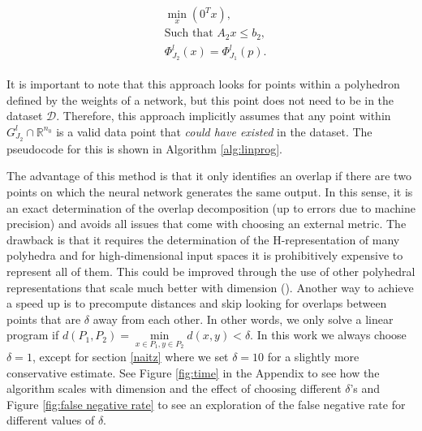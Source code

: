 \documentclass[10pt]{article} %
\theoremstyle{plain}
\theoremstyle{definition}
\theoremstyle{remark}
\begin{document}
\begin{align}
\begin{split}
    & \min\limits_{x}(0^Tx),\\
    & \text{Such that } A_2x \leq b_2, \\
    & \Phi^l_{J_2}(x) = \Phi^l_{J_1}(p).    
\end{split}
\end{align}

It is important to note that this approach looks for points within a polyhedron defined by the weights of a network, but this point does not need to be in the dataset $\mathcal{D}$. Therefore, this approach implicitly assumes that any point within $G^l_{J_2} \cap \mathbb{R}^{n_0}$ is a valid data point that \textit{could have existed} in the dataset. The pseudocode for this is shown in Algorithm \ref{alg:linprog}.


The advantage of this method is that it only identifies an overlap if there are two points on which the neural network generates the same output. In this sense, it is an exact determination of the overlap decomposition (up to errors due to machine precision) and avoids all issues that come with choosing an external metric. The drawback is that it requires the determination of the H-representation of many polyhedra and for high-dimensional input spaces it is prohibitively expensive to represent all of them. This could be improved through the use of other polyhedral representations that scale much better with dimension (\cite{kochdumper2019representation, sigl2023m}). Another way to achieve a speed up is to precompute distances and skip looking for overlaps between points that are $\delta$ away from each other. {In other words, we only solve a linear program if $d(P_1,P_2) = \min\limits_{x\in P_1, y\in P_2}d(x,y)<\delta$.} In this work we always choose $\delta=1$, except for section \ref{naitz} where we set $\delta=10$ for a slightly more conservative estimate. See Figure \ref{fig:time} in the Appendix to see how the algorithm scales with dimension and the effect of choosing different $\delta$'s {and Figure \ref{fig:false negative rate} to see an exploration of the false negative rate for different values of $\delta$}.
\end{document}
